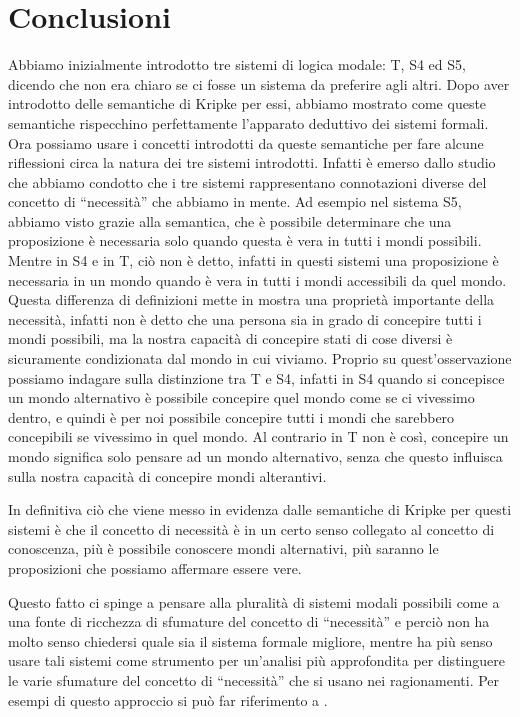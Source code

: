\documentclass[a4paper, titlepage, 12pt]{report}
\begin{document}
\chapter*{Conclusioni}
Abbiamo inizialmente introdotto tre sistemi di logica modale: T, S4 ed S5,
dicendo che non era chiaro se ci fosse un sistema da preferire agli altri.
Dopo aver introdotto delle semantiche di Kripke per essi, abbiamo mostrato
come queste semantiche rispecchino perfettamente l'apparato deduttivo dei sistemi formali.
Ora possiamo usare i concetti introdotti da queste semantiche per fare alcune riflessioni
circa la natura dei tre sistemi introdotti. Infatti è emerso dallo studio che abbiamo condotto
che i tre sistemi rappresentano connotazioni diverse del concetto di ``necessità''
che abbiamo in mente.
Ad esempio nel sistema S5, abbiamo visto grazie alla semantica, che è possibile
determinare che una proposizione è necessaria solo quando questa è vera in tutti i mondi
possibili. Mentre in S4 e in T, ciò non è detto, infatti in questi sistemi una proposizione
è necessaria in un mondo quando è vera in tutti i mondi accessibili da quel mondo.
Questa differenza di definizioni mette in mostra una proprietà importante della necessità,
infatti non è detto che una persona sia in grado di concepire tutti i mondi possibili,
ma la nostra capacità di concepire stati di cose diversi è sicuramente condizionata dal mondo
in cui viviamo. Proprio su quest'osservazione possiamo indagare sulla distinzione tra T e S4,
infatti in S4 quando si concepisce un mondo alternativo è possibile concepire quel mondo
come se ci vivessimo dentro, e quindi è per noi possibile concepire tutti i mondi che sarebbero
concepibili se vivessimo in quel mondo. Al contrario in T non è così, concepire un mondo
significa solo pensare ad un mondo alternativo, senza che questo influisca sulla nostra capacità
di concepire mondi alterantivi.

In definitiva ciò che viene messo in evidenza dalle semantiche di Kripke per questi sistemi è
che il concetto di necessità è in un certo senso collegato al concetto di conoscenza, più
è possibile conoscere mondi alternativi, più saranno le proposizioni che possiamo
affermare essere vere.

Questo fatto ci spinge a pensare alla pluralità di sistemi modali possibili
come a una fonte di ricchezza di sfumature del concetto di ``necessità'' e perciò non ha molto
senso chiedersi quale sia il sistema formale migliore, mentre ha più senso usare tali sistemi
come strumento per un'analisi più approfondita per distinguere le varie sfumature del concetto
di ``necessità'' che si usano nei ragionamenti.
Per esempi di questo approccio si può far riferimento a \cite{Lemmon}.
\end{document}
